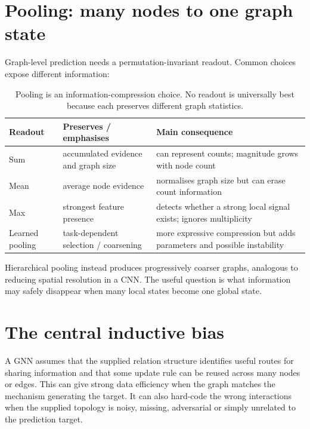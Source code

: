 \section{Pooling: many nodes to one graph state}
Graph-level prediction needs a permutation-invariant readout.
Common choices expose different information:

\begin{table}[htbp]
\centering
\small
\begin{tabular}{p{}p{}p{}}
\toprule
Readout & Preserves / emphasises & Main consequence \\
\midrule
Sum & accumulated evidence and graph size & can represent counts; magnitude grows with node count \\
Mean & average node evidence & normalises graph size but can erase count information \\
Max & strongest feature presence & detects whether a strong local signal exists; ignores multiplicity \\
Learned pooling & task-dependent selection / coarsening & more expressive compression but adds parameters and possible instability \\
\bottomrule
\end{tabular}
\caption{Pooling is an information-compression choice. No readout is universally best because each preserves different graph statistics.}
\label{tab:gnn-pooling}
\end{table}

Hierarchical pooling instead produces progressively coarser graphs, analogous to reducing spatial resolution in a CNN.
The useful question is what information may safely disappear when many local states become one global state.

\section{The central inductive bias}
A GNN assumes that the supplied relation structure identifies useful routes for sharing information and that some update rule can be reused across many nodes or edges.
This can give strong data efficiency when the graph matches the mechanism generating the target.
It can also hard-code the wrong interactions when the supplied topology is noisy, missing, adversarial or simply unrelated to the prediction target.

